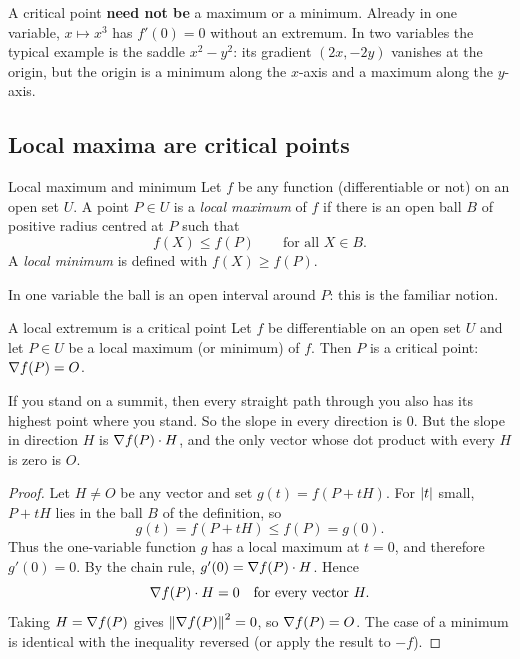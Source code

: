 \begin{trap}
A critical point \textbf{need not be} a maximum or a minimum. Already in one variable,
$x\mapsto x^3$ has $f'(0)=0$ without an extremum. In two variables the typical example is the
saddle $x^2-y^2$: its gradient $(2x,-2y)$ vanishes at the origin, but the origin is a minimum
along the $x$-axis and a maximum along the $y$-axis.
\end{trap}

\subsection{Local maxima are critical points}

\begin{definition}{Local maximum and minimum}
Let $f$ be any function (differentiable or not) on an open set $U$. A point $P\in U$ is a
\emph{local maximum} of $f$ if there is an open ball $B$ of positive radius centred at $P$
such that
\[ f(X)\le f(P)\qquad\text{for all }X\in B . \]
A \emph{local minimum} is defined with $f(X)\ge f(P)$.
\end{definition}

In one variable the ball is an open interval around $P$: this is the familiar notion.

\begin{theorem}[label=thm:fermat]{A local extremum is a critical point}
Let $f$ be differentiable on an open set $U$ and let $P\in U$ be a local maximum (or
minimum) of $f$. Then $P$ is a critical point: $\nabla f(P)=O$.
\end{theorem}

\begin{intuition}
If you stand on a summit, then every straight path through you also has its highest point
where you stand. So the slope in every direction is $0$. But the slope in direction $H$ is
$\nabla f(P)\cdot H$, and the only vector whose dot product with every $H$ is zero is $O$.
\end{intuition}

\begin{proof}
Let $H\neq O$ be any vector and set $g(t)=f(P+tH)$. For $\left\lvert t\right\rvert$ small, $P+tH$ lies in the
ball $B$ of the definition, so
\[ g(t)=f(P+tH)\le f(P)=g(0). \]
Thus the one-variable function $g$ has a local maximum at $t=0$, and therefore $g'(0)=0$.
By the chain rule, $g'(0)=\nabla f(P)\cdot H$. Hence
\[ \nabla f(P)\cdot H=0\quad\text{for every vector }H . \]
Taking $H=\nabla f(P)$ gives $\left\lVert \nabla f(P)\right\rVert^2=0$, so $\nabla f(P)=O$. The case of a minimum is
identical with the inequality reversed (or apply the result to $-f$).
\end{proof}

